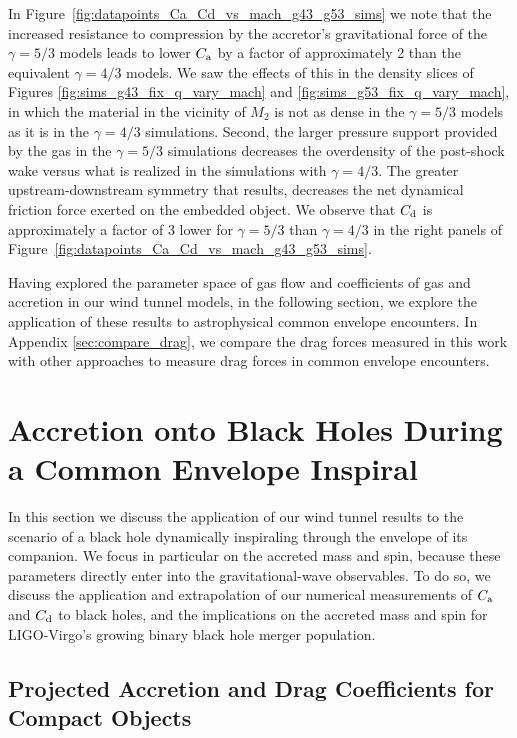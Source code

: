 In Figure~\ref{fig:datapoints_Ca_Cd_vs_mach_g43_g53_sims} we note that the increased resistance to compression by the accretor's gravitational force of the $\gamma = 5/3$ models leads to lower $C_{\rm a}$ by a factor of approximately 2 than the equivalent $\gamma=4/3$ models.   We saw the effects of this in the density slices of Figures \ref{fig:sims_g43_fix_q_vary_mach} and \ref{fig:sims_g53_fix_q_vary_mach}, in which the material in the vicinity of $M_2$ is not as dense in the $\gamma = 5/3$ models as it is in the $\gamma = 4/3$ simulations.  Second, the larger pressure support provided by the gas in the $\gamma = 5/3$ simulations decreases the overdensity of the post-shock wake versus what is realized in the simulations with $\gamma = 4/3$.  The greater upstream-downstream symmetry that results, decreases the net dynamical friction force exerted on the embedded object. We observe that $C_{\rm d}$ is approximately a factor of 3 lower for $\gamma=5/3$ than $\gamma=4/3$ in the right panels of Figure~\ref{fig:datapoints_Ca_Cd_vs_mach_g43_g53_sims}. 

Having explored the parameter space of gas flow and coefficients of gas and accretion in our wind tunnel models, in the following section, we explore the application of these results to astrophysical common envelope encounters. In Appendix \ref{sec:compare_drag}, we compare the drag forces measured in this work with other approaches to measure drag forces in common envelope encounters.

\vspace{5mm}
\section{Accretion onto Black Holes During a Common Envelope Inspiral}\label{sec:implications}
In this section we discuss the application of our wind tunnel results to the scenario of a black hole dynamically inspiraling through the envelope of its companion. We focus in particular on the accreted mass and spin, because these parameters directly enter into the gravitational-wave observables.  To do so, we discuss the application and extrapolation of our numerical measurements of $C_{\rm a}$ and $C_{\rm d}$ to black holes, and the implications on the accreted mass and spin for LIGO-Virgo's growing binary black hole merger population. 

\vspace*{2.5mm}
\subsection{Projected Accretion and Drag Coefficients for Compact Objects}\label{sec:sink}


